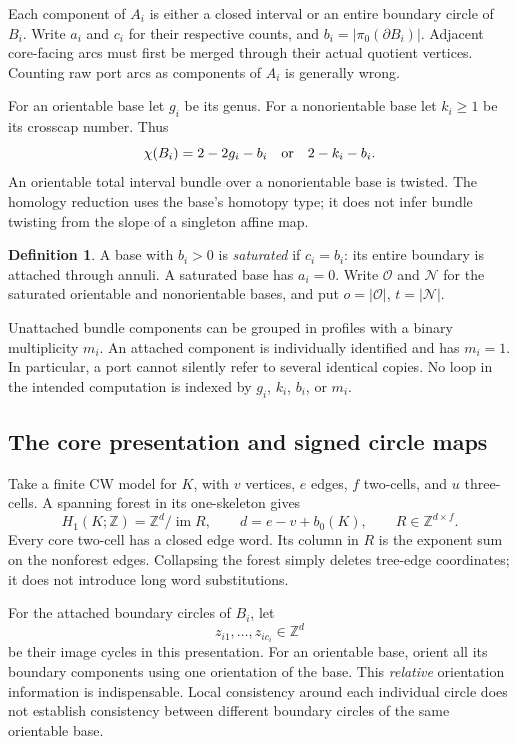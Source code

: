 \documentclass[11pt]{article}
\theoremstyle{definition}
\newtheorem{definition}[theorem]{Definition}
\theoremstyle{remark}
\newcommand{\Z}{\mathbb Z}
\newcommand{\im}{\operatorname{im}}
\newcommand{\satO}{\mathcal O}
\newcommand{\satN}{\mathcal N}
\begin{document}
Each component of $A_i$ is either a closed interval or an entire boundary
circle of $B_i$. Write $a_i$ and $c_i$ for their respective counts, and
$b_i=|\pi_0(\partial B_i)|$. Adjacent core-facing arcs must first be merged
through their actual quotient vertices. Counting raw port arcs as components
of $A_i$ is generally wrong.

For an orientable base let $g_i$ be its genus. For a nonorientable base let
$k_i\geq1$ be its crosscap number. Thus
\[
 \chi(B_i)=2-2g_i-b_i\quad\hbox{or}\quad2-k_i-b_i.
\]
An orientable total interval bundle over a nonorientable base is twisted.
The homology reduction uses the base's homotopy type; it does not infer
bundle twisting from the slope of a singleton affine map.

\begin{definition}
A base with $b_i>0$ is \emph{saturated} if $c_i=b_i$: its entire boundary is
attached through annuli. A saturated base has $a_i=0$. Write $\satO$ and
$\satN$ for the saturated orientable and nonorientable bases, and put
$o=|\satO|$, $t=|\satN|$.
\end{definition}

Unattached bundle components can be grouped in profiles with a binary
multiplicity $m_i$. An attached component is individually identified and
has $m_i=1$. In particular, a port cannot silently refer to several identical
copies. No loop in the intended computation is indexed by $g_i$, $k_i$,
$b_i$, or $m_i$.

\subsection{The core presentation and signed circle maps}
Take a finite CW model for $K$, with $v$ vertices, $e$ edges, $f$ two-cells,
and $u$ three-cells. A spanning forest in its one-skeleton gives
\[
 H_1(K;\Z)=\Z^d/\im R,\qquad d=e-v+b_0(K),
 \qquad R\in\Z^{d\times f}.
\]
Every core two-cell has a closed edge word. Its column in $R$ is the exponent
sum on the nonforest edges. Collapsing the forest simply deletes tree-edge
coordinates; it does not introduce long word substitutions.

For the attached boundary circles of $B_i$, let
\[
 z_{i1},\ldots,z_{ic_i}\in\Z^d
\]
be their image cycles in this presentation. For an orientable base, orient
all its boundary components using one orientation of the base. This
\emph{relative} orientation information is indispensable. Local consistency
around each individual circle does not establish consistency between different
boundary circles of the same orientable base.
\end{document}
